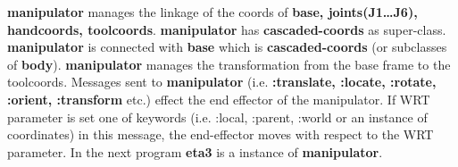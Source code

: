 \begin{refdesc}



\end{refdesc}
{\bf manipulator} manages the linkage of the coords of 
{\bf base, joints(J1\ldots J6), handcoords, toolcoords}. 
{\bf manipulator} has {\bf cascaded-coords} as super-class. 
{\bf manipulator} is connected with {\bf base} which is {\bf cascaded-coords}
(or subclasses of {\bf body}). {\bf manipulator} manages the transformation from 
the base frame to the toolcoords. Messages sent to {\bf manipulator} 
(i.e. {\bf :translate, :locate, :rotate, :orient, :transform} etc.) effect 
the end effector of the manipulator. If WRT parameter is set one of keywords 
(i.e. :local, :parent, :world or an instance of coordinates) in this message, 
the end-effector  moves with respect to the WRT parameter. 
In the next program {\bf eta3} is a instance of {\bf manipulator}.



